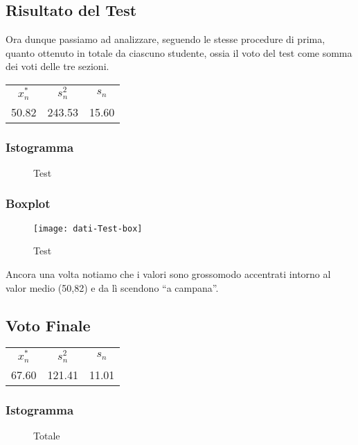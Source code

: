 \thispagestyle{empty} %
\subsection{Risultato del Test}
Ora dunque passiamo ad analizzare, seguendo le stesse procedure di prima, quanto ottenuto in totale da ciascuno studente, ossia il voto del test come somma dei voti delle tre sezioni.
\begin{center}
\begin{tabular}{ccc}
  \toprule
  \(x_{n}^{*}\) & \(s_n^2\) & \(s_n\) \\
  50.82 & 243.53 & 15.60 \\
  \bottomrule
\end{tabular}
\end{center}

\subsubsection{Istogramma}
\begin{figure}[!h]
  \caption{Test}
\end{figure}

\subsubsection{Boxplot}
\begin{figure}[!h]
  \centering
  \texttt{[image: dati-Test-box]}
  \caption{Test}
\end{figure}
Ancora una volta notiamo che i valori sono grossomodo accentrati intorno al valor medio (50,82) e da lì scendono “a campana”.
\restoregeometry
\clearpage
\thispagestyle{empty} %
\subsection{Voto Finale}

\begin{center}
\begin{tabular}{ccc}
  \toprule
  \(x_{n}^{*}\) & \(s_n^2\) & \(s_n\) \\
  67.60 & 121.41 & 11.01 \\ 
  \bottomrule
\end{tabular}
\end{center}

\subsubsection{Istogramma}
\begin{figure}[!h]
  \caption{Totale}
\end{figure}

